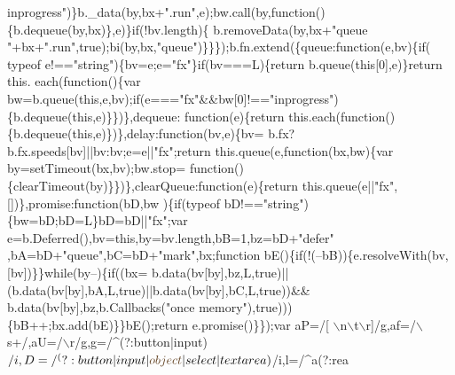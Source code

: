 \begin{DoxyCode}
{      inprogress"})\}b.\_data(by,bx+\textcolor{stringliteral}{".run"},e);bw.call(by,\textcolor{keyword}{function}()\{b.dequeue(by,bx)\},e)\}\textcolor{keywordflow}{if}(!bv.length)\{
      b.removeData(by,bx+\textcolor{stringliteral}{"queue "}+bx+\textcolor{stringliteral}{".run"},\textcolor{keyword}{true});bi(by,bx,\textcolor{stringliteral}{"queue"})\}\}\});b.fn.extend(\{queue:\textcolor{keyword}{function}(e,bv)\{\textcolor{keywordflow}{if}(
      typeof e!==\textcolor{stringliteral}{"string"})\{bv=e;e=\textcolor{stringliteral}{"fx"}\}\textcolor{keywordflow}{if}(bv===L)\{\textcolor{keywordflow}{return} b.queue(\textcolor{keyword}{this}[0],e)\}\textcolor{keywordflow}{return} this.
      each(\textcolor{keyword}{function}()\{var bw=b.queue(\textcolor{keyword}{this},e,bv);\textcolor{keywordflow}{if}(e===\textcolor{stringliteral}{"fx"}&&bw[0]!==\textcolor{stringliteral}{"inprogress"})\{b.dequeue(\textcolor{keyword}{this},e)\}\})\},dequeue:\textcolor{keyword}{
      function}(e)\{\textcolor{keywordflow}{return} this.each(\textcolor{keyword}{function}()\{b.dequeue(\textcolor{keyword}{this},e)\})\},delay:\textcolor{keyword}{function}(bv,e)\{bv=
      b.fx?b.fx.speeds[bv]||bv:bv;e=e||\textcolor{stringliteral}{"fx"};\textcolor{keywordflow}{return} this.queue(e,\textcolor{keyword}{function}(bx,bw)\{var by=setTimeout(bx,bv);bw.stop=\textcolor{keyword}{
      function}()\{clearTimeout(by)\}\})\},clearQueue:\textcolor{keyword}{function}(e)\{\textcolor{keywordflow}{return} this.queue(e||\textcolor{stringliteral}{"fx"},[])\},promise:\textcolor{keyword}{function}(bD,bw
      )\{\textcolor{keywordflow}{if}(typeof bD!==\textcolor{stringliteral}{"string"})\{bw=bD;bD=L\}bD=bD||\textcolor{stringliteral}{"fx"};var e=b.Deferred(),bv=\textcolor{keyword}{this},by=bv.length,bB=1,bz=bD+\textcolor{stringliteral}{"defer"}
      ,bA=bD+\textcolor{stringliteral}{"queue"},bC=bD+\textcolor{stringliteral}{"mark"},bx;\textcolor{keyword}{function} bE()\{\textcolor{keywordflow}{if}(!(--bB))\{e.resolveWith(bv,[bv])\}\}\textcolor{keywordflow}{while}(by--)\{\textcolor{keywordflow}{if}((bx=
      b.data(bv[by],bz,L,\textcolor{keyword}{true})||(b.data(bv[by],bA,L,\textcolor{keyword}{true})||b.data(bv[by],bC,L,\textcolor{keyword}{true}))&&
      b.data(bv[by],bz,b.Callbacks(\textcolor{stringliteral}{"once memory"}),\textcolor{keyword}{true})))\{bB++;bx.add(bE)\}\}bE();\textcolor{keywordflow}{return} e.promise()\}\});var aP=/[
      \(\backslash\)n\(\backslash\)t\(\backslash\)r]/g,af=/\(\backslash\)s+/,aU=/\(\backslash\)r/g,g=/^(?:button|input)$/i,D=/^(?:button|input|\textcolor{keywordtype}{object}|select|textarea)$/i,l=/^a(?:rea

\end{DoxyCode}
